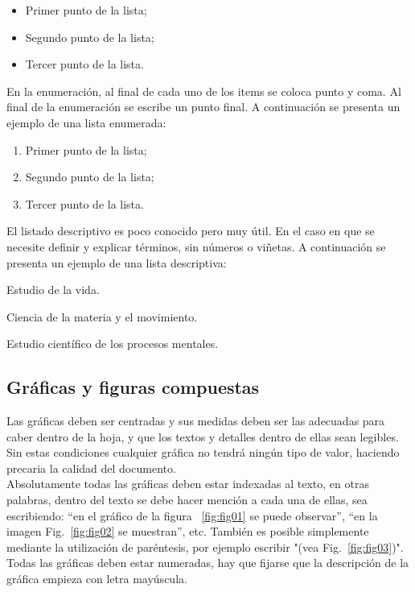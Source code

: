 \documentclass[
10pt,			%
letterpaper,	%
oneside,		%
headinclude, footinclude, %
BCOR5mm, 		%
]{scrartcl}
\begin{document}
\begin{itemize}[noitemsep] %
	\item Primer punto de la lista;
	\item Segundo punto de la lista;
	\item Tercer punto de la lista.
\end{itemize}
En la enumeración, al final de cada uno de los items se coloca punto y coma. Al final de la enumeración se escribe un punto final.
A continuación se presenta un ejemplo de una lista enumerada:

\begin{enumerate}[noitemsep] %
	\item Primer punto de la lista;
	\item Segundo punto de la lista;
	\item Tercer punto de la lista.
\end{enumerate}
El listado descriptivo es poco conocido pero muy útil. En el caso en que se necesite definir y explicar términos, sin números o viñetas.
A continuación se presenta un ejemplo de una lista descriptiva:

\begin{description}[noitemsep] %
	\item[Biología] Estudio de la vida.
	\item[Física] Ciencia de la materia y el movimiento.
	\item[Psicología] Estudio científico de los procesos mentales.
\end{description}

\subsection{Gráficas y figuras compuestas}
Las gráficas deben ser centradas y sus medidas deben ser las adecuadas para caber dentro de la hoja, y que los textos y detalles dentro de ellas sean legibles. Sin estas condiciones cualquier gráfica no tendrá ningún tipo de valor, haciendo precaria la calidad del documento.\\
Absolutamente todas las gráficas deben estar indexadas al texto, en otras palabras, dentro del texto se debe hacer mención a cada una de ellas, sea escribiendo: “en el gráfico de la figura ~\vref{fig:fig01} se puede observar”, “en la imagen Fig.~\vref{fig:fig02} se muestran”, etc. También es posible simplemente mediante la utilización de paréntesis, por ejemplo escribir "(vea Fig.~\vref{fig:fig03})". Todas las gráficas deben estar numeradas, hay que fijarse que la descripción de la gráfica empieza con letra mayúscula.
\end{document}
